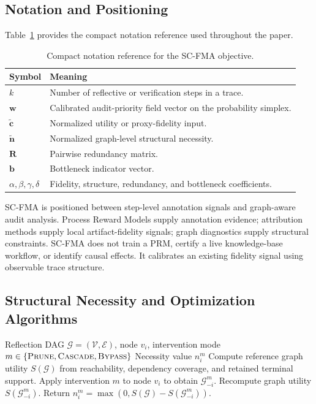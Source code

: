 \documentclass[pdflatex,sn-mathphys-num]{sn-jnl}
\begin{document}
\subsection{Notation and Positioning}
\label{app:notation-positioning}

Table~\ref{tab:supp-notation} provides the compact notation reference used throughout the paper.

\begin{table}[ht]
\caption{Compact notation reference for the SC-FMA objective.}
\label{tab:supp-notation}
\centering
\small
\begin{tabular}{ll}
\toprule
\textbf{Symbol} & \textbf{Meaning} \\
\midrule
$k$ & Number of reflective or verification steps in a trace. \\
$\mathbf{w}$ & Calibrated audit-priority field vector on the probability simplex. \\
$\tilde{\mathbf{c}}$ & Normalized utility or proxy-fidelity input. \\
$\tilde{\mathbf{n}}$ & Normalized graph-level structural necessity. \\
$\mathbf{R}$ & Pairwise redundancy matrix. \\
$\mathbf{b}$ & Bottleneck indicator vector. \\
$\alpha,\beta,\gamma,\delta$ & Fidelity, structure, redundancy, and bottleneck coefficients. \\
\bottomrule
\end{tabular}
\end{table}

SC-FMA is positioned between step-level annotation signals and graph-aware audit analysis. Process Reward Models supply annotation evidence; attribution methods supply local artifact-fidelity signals; graph diagnostics supply structural constraints. SC-FMA does not train a PRM, certify a live knowledge-base workflow, or identify causal effects. It calibrates an existing fidelity signal using observable trace structure.

\subsection{Structural Necessity and Optimization Algorithms}
\label{app:algorithms}

\begin{algorithm}[ht]
\caption{Structural Necessity Computation}
\label{alg:supp-structural-necessity}
\begin{algorithmic}[1]
\Require Reflection DAG $\mathcal{G}=(\mathcal{V},\mathcal{E})$, node $v_i$, intervention mode $m\in\{\textsc{Prune},\textsc{Cascade},\textsc{Bypass}\}$
\Ensure Necessity value $n_i^{m}$
\State Compute reference graph utility $S(\mathcal{G})$ from reachability, dependency coverage, and retained terminal support.
\State Apply intervention $m$ to node $v_i$ to obtain $\mathcal{G}_{-i}^{m}$.
\State Recompute graph utility $S(\mathcal{G}_{-i}^{m})$.
\State Return $n_i^{m}=\max(0,S(\mathcal{G})-S(\mathcal{G}_{-i}^{m}))$.
\end{algorithmic}
\end{algorithm}
\end{document}
